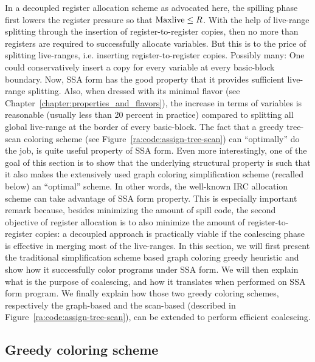 {In a decoupled register allocation scheme as advocated here, the spilling phase first lowers the register pressure so that $\mathrm{Maxlive} \leq R$.
With the help of live-range splitting through the insertion of register-to-register copies, then no more than \regs registers are required to successfully allocate variables.
But this is to the price of splitting live-ranges, i.e. inserting register-to-register copies.
Possibly many:
One could conservatively insert a copy for every variable at every basic-block boundary.
Now, SSA form has the good property that it provides sufficient live-range splitting.
Also, when dressed with its minimal flavor (see Chapter~\ref{chapter:properties_and_flavors}), the increase in terms of variables is reasonable (usually less than 20 percent in practice) compared to splitting all global live-range at the border of every basic-block.
The fact that a greedy tree-scan coloring scheme (see Figure~\ref{ra:code:assign-tree-scan}) can ``optimally'' do the job, is quite useful property of SSA form.
Even more interestingly, one of the goal of this section is to show that the underlying structural property is such that it also makes the extensively used graph coloring simplification scheme (recalled below) an ``optimal'' scheme.
In other words, the well-known IRC allocation scheme can take advantage of SSA form property.
This is especially important remark because, besides minimizing the amount of spill code, the second objective of register allocation is to also minimize the amount of register-to-register copies:
a decoupled approach is practically viable if the coalescing phase is effective in merging most of the live-ranges.
In this section, we will first present the traditional simplification scheme based graph coloring greedy heuristic and show how it successfully color programs under SSA form.
We will then explain what is the purpose of coalescing, and how it translates when performed on SSA form program.
We finally explain how those two greedy coloring schemes, respectively the graph-based and the scan-based (described in Figure~\ref{ra:code:assign-tree-scan}), can be extended to perform efficient coalescing.

 

\subsection{Greedy coloring scheme}
\label{sec:ra:greedy-col}

}
